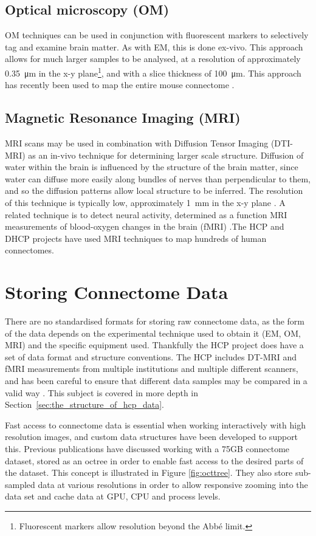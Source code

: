 \documentclass[MSc,paper=a4,pagesize=auto]{icldt}
\begin{document}
\subsection{Optical microscopy (OM)} 
OM techniques can be used in conjunction with fluorescent markers to selectively tag and examine brain matter. As with EM, this is done ex-vivo. This approach allows for much larger samples to be analysed, at a resolution of approximately \SI{0.35}{\um} in the x-y plane\footnote{Fluorescent markers allow resolution beyond the Abb\'{e} limit.}, and with a slice thickness of \SI{100}{\um}. This approach has recently been used to map the entire mouse connectome \cite{Oh2014}. 

\subsection{Magnetic Resonance Imaging (MRI)} 
MRI scans may be used in combination with Diffusion Tensor Imaging (DTI-MRI) as an in-vivo technique for determining larger scale structure. Diffusion of water within the brain is influenced by the structure of the brain matter, since water can diffuse more easily along bundles of nerves than perpendicular to them, and so the diffusion patterns allow local structure to be inferred. The resolution of this technique is typically low, approximately \SI{1}{\mm} in the x-y plane \cite{Westin2002}. A related technique is to detect neural activity, determined as a function MRI measurements of blood-oxygen changes in the brain (fMRI) \cite{Huettel2004}.The HCP and DHCP projects have used MRI techniques to map hundreds of human connectomes. 


\section{Storing Connectome Data}
There are no standardised formats for storing raw connectome data, as the form of the data depends on the experimental technique used to obtain it (EM, OM, MRI) and the specific equipment used. Thankfully the HCP project does have a set of data format and structure conventions. The HCP includes DT-MRI and fMRI measurements from multiple institutions and multiple different scanners, and has been careful to ensure that different data samples may be compared in a valid way \cite{HCP_Logistics_2014}. This subject is covered in more depth in Section~\ref{sec:the_structure_of_hcp_data}.

Fast access to connectome data is essential when working interactively with high resolution images, and custom data structures have been developed to support this. Previous publications \cite{Jeong2010} have discussed working with a 75GB connectome dataset, stored as an octree in order to enable fast access to the desired parts of the dataset. This concept is illustrated in Figure \ref{fig:octtree}. They also store sub-sampled data at various resolutions in order to allow responsive zooming into the data set and cache data at GPU, CPU and process levels. 
\end{document}
